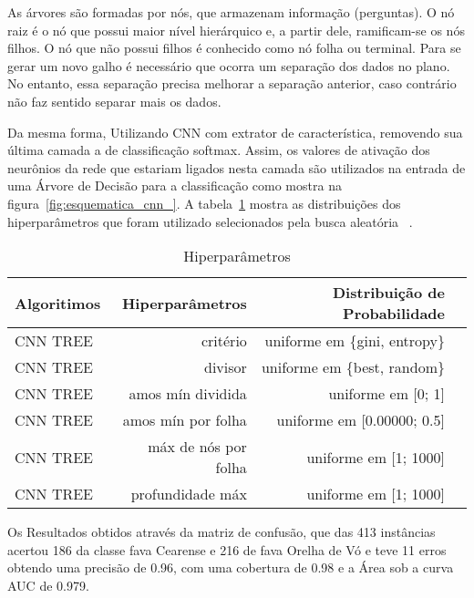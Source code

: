 As árvores são formadas por nós, que armazenam informação (perguntas). O nó raiz é o nó que possui maior nível hierárquico e, a partir dele, ramificam-se os nós filhos. O nó que não possui filhos é conhecido como nó folha ou terminal. Para se gerar um novo galho é necessário que ocorra um separação dos dados no plano. No entanto, essa separação precisa melhorar a separação anterior, caso contrário não faz sentido separar mais os dados.

Da mesma forma, Utilizando CNN com extrator de característica, removendo sua última camada a de classificação softmax. Assim, os valores de ativação dos neurônios da rede que estariam ligados nesta camada são utilizados na entrada de uma Árvore de Decisão para a classificação como mostra na figura~\ref{fig:esquematica_cnn_}. A tabela~\ref{tabela:hiperparametros_tree}  mostra as distribuições dos hiperparâmetros que foram utilizado selecionados pela busca aleatória  ~\cite{Bergstra_James}.

\begin{table}[H]
\centering
\caption{Hiperparâmetros}
\label{tabela:hiperparametros_tree}
\def\arraystretch{1.2}
\begin{tabular}{@{}lrrr@{}}
\toprule
{\textbf{Algoritimos}} & {\textbf{Hiperparâmetros}} & {\textbf{Distribuição de Probabilidade}}  \\
\midrule
CNN TREE & critério &  uniforme em \{gini, entropy\} \\ 
CNN TREE & divisor & uniforme em \{best, random\} \\ 
CNN TREE & amos mín dividida & uniforme em [0; 1] \\ 
CNN TREE & amos mín por folha & uniforme em [0.00000; 0.5] \\ 
CNN TREE & máx de nós por folha & uniforme em [1; 1000] \\ 
CNN TREE & profundidade máx & uniforme em [1; 1000]\\ 
\bottomrule
\end{tabular}
\end{table}

Os Resultados obtidos através da matriz de confusão, que das 413 instâncias acertou 186 da classe fava Cearense e 216 de fava Orelha de Vó e teve 11 erros obtendo uma precisão de 0.96, com uma cobertura de 0.98 e a Área sob a curva AUC de 0.979.


